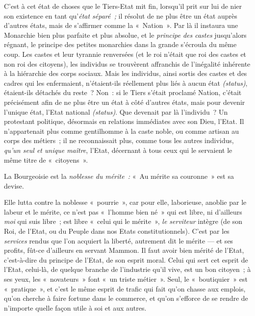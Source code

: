 \documentclass[french,twoside]{book} %
\begin{document}
C’est à cet état de choses que le Tiers-Etat mit fin, lorsqu’il prit sur lui de nier son existence en tant qu’\emph{état séparé ;} il résolut de ne plus être un état auprès d’autres états, mais de s’affirmer comme la « Nation ». Par là il instaura une Monarchie bien plus parfaite et plus absolue, et le \emph{principe des castes }jusqu’alors régnant, le principe des petites monarchies dans la grande s’écroula du même coup. Les castes et leur tyrannie renversées (et le roi n’était que roi des castes et non roi des citoyens), les individus  se trouvèrent affranchis de l’inégalité inhérente à la hiérarchie des corps sociaux. Mais les individus, ainsi sortis des castes et des cadres qui les enfermaient, n’étaient-ils réellement plus liés à aucun état \emph{(status)}, étaient-ils détachés du reste ? Non : si le Tiers s’était proclamé Nation, c’était précisément afin de ne plus être un état à côté d’autres états, mais pour devenir l’unique état, l’Etat national \emph{(status)}. Que devenait par là l’individu ? Un protestant politique, désormais en relations immédiates avec son Dieu, l’Etat. Il n’appartenait plus comme gentilhomme à la caste noble, ou comme artisan au corps des métiers ; il ne reconnaissait plus, comme tous les autres individus, \emph{qu’un seul et unique maître}, l’Etat, décernant à tous ceux qui le servaient le même titre de « citoyens ».\par
La Bourgeoisie est la \emph{noblesse du mérite :} « Au mérite sa couronne » est sa devise.\par
Elle lutta contre la noblesse « pourrie », car pour elle, laborieuse, anoblie par le labeur et le mérite, ce n’est pas « l’homme bien né » qui est libre, ni d’ailleurs \emph{moi} qui suis libre ; est libre « celui qui le mérite », \emph{le serviteur} intègre (de son Roi, de l’Etat, ou du Peuple dans nos Etats constitutionnels). C’est par les \emph{services} rendus que l’on acquiert la liberté, autrement dit le mérite — et ses profits, fût-ce d’ailleurs en servant Mammon. Il faut avoir bien mérité de l’Etat, c’est-à-dire du principe de l’Etat, de son esprit moral. Celui qui sert cet esprit de l’Etat, celui-là, de quelque branche de l’industrie qu’il vive, est un bon citoyen ; à ses yeux, les « novateurs » font « un triste métier ». Seul, le « boutiquier » est « pratique », et c’est le même esprit de trafic qui fait qu’on chasse aux emplois, qu’on cherche à faire fortune dans le commerce, et qu’on s’efforce de se rendre de n’importe quelle façon utile à soi et aux autres.\par
\end{document}

